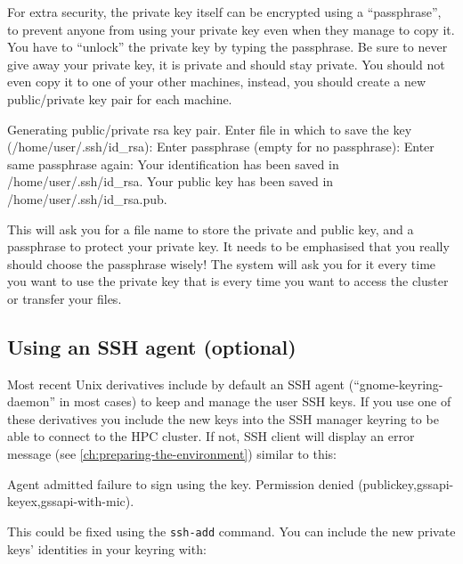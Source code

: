   For extra security, the private key itself can be encrypted using a ``passphrase'',
  to prevent anyone from using your private key even when they manage to copy
  it. You have to ``unlock'' the private key by typing the passphrase.
  Be sure to never give away your private key, it is private and should stay private.
  You should not even copy it to one of your other machines, instead, you should create a
  new public/private key pair for each machine.

\begin{prompt}
Generating public/private rsa key pair.
Enter file in which to save the key (/home/user/.ssh/id_rsa):
Enter passphrase (empty for no passphrase):
Enter same passphrase again:
Your identification has been saved in /home/user/.ssh/id_rsa.
Your public key has been saved in /home/user/.ssh/id_rsa.pub.
\end{prompt}

  This will ask you for a file name to store the private and public key, and a
  passphrase to protect your private key. It needs to be emphasised that you
  really should choose the passphrase wisely! The system will ask you for it
  every time you want to use the private key that is every time you want to
  access the cluster or transfer your files.

\fi %

\ifmacORlinux

\subsection{Using an SSH agent (optional)}
\label{sec:using-ssh-agent-with-openssh}
  Most recent Unix derivatives include by default an SSH agent
  \iflinux(``gnome-keyring-daemon'' in most cases) \fi to keep and manage the user SSH keys.
  If you use one of these derivatives you  include the new keys into
  the SSH manager keyring to be able to connect to the HPC cluster. If not,
  SSH client will display an error message (see \autoref{ch:preparing-the-environment})
  similar to this:

  \begin{flattext}
   Agent admitted failure to sign using the key.
   Permission denied (publickey,gssapi-keyex,gssapi-with-mic).
  \end{flattext}

  This could be fixed using the \lstinline|ssh-add| command.
  You can include the new private keys' identities in your keyring with:

